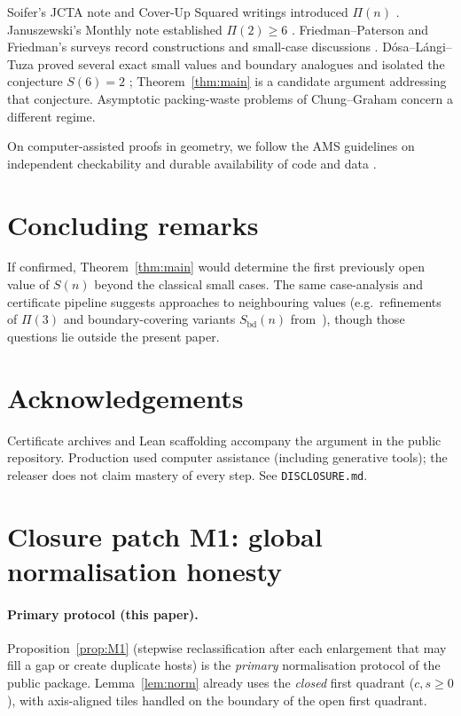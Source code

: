 \documentclass[11pt,reqno]{amsart}
\theoremstyle{definition}
\begin{document}
Soifer's JCTA note and Cover-Up Squared writings introduced $\Pi(n)$
\cite{Soifer2006,SoiferCoverUp}.
Januszewski's Monthly note established $\Pi(2)\ge 6$ \cite{Januszewski2009}.
Friedman--Paterson and Friedman's surveys record constructions and small-case
discussions \cite{FriedmanPaterson2006,FriedmanCovering}.
D\'osa--L\'angi--Tuza proved several exact small values and boundary analogues
and isolated the conjecture $S(6)=2$ \cite{DLT2026}; Theorem~\ref{thm:main}
is a candidate argument addressing that conjecture.
Asymptotic packing-waste problems of Chung--Graham
\cite{ChungGraham2009,ChungGraham2020} concern a different regime.

On computer-assisted proofs in geometry, we follow the AMS guidelines on
independent checkability and durable availability of code and data
\cite{AMSComputerAssisted}.

\section{Concluding remarks}\label{sec:conclusion}

If confirmed, Theorem~\ref{thm:main} would determine the first previously open
value of $S(n)$ beyond the classical small cases.  The same case-analysis and certificate
pipeline suggests approaches to neighbouring values (e.g.\ refinements of
$\Pi(3)$ and boundary-covering variants $S_{\mathrm{bd}}(n)$ from~\cite{DLT2026}),
though those questions lie outside the present paper.

\section*{Acknowledgements}
Certificate archives and Lean scaffolding accompany the argument in the public
repository.  Production used computer assistance (including generative tools);
the releaser does not claim mastery of every step.  See
\texttt{DISCLOSURE.md}.


\appendix
\section{Closure patch M1: global normalisation honesty}\label{app:M1}

\paragraph{Primary protocol (this paper).}
Proposition~\ref{prop:M1} (stepwise reclassification after each enlargement that
may fill a gap or create duplicate hosts) is the \emph{primary} normalisation
protocol of the public package.  Lemma~\ref{lem:norm} already uses the
\emph{closed} first quadrant ($c,s\ge 0$), with axis-aligned tiles handled on
the boundary of the open first quadrant.
\end{document}
